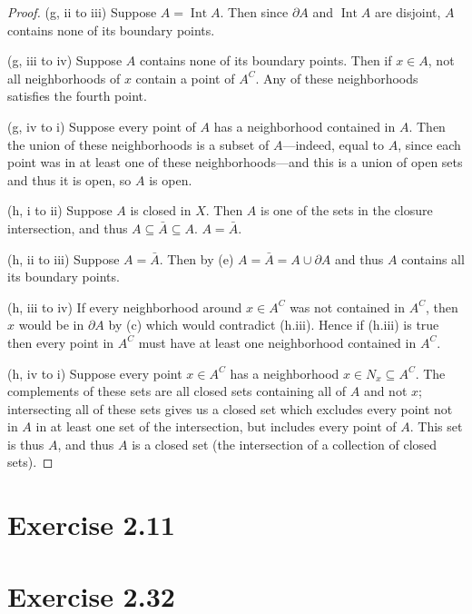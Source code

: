 \documentclass{article}
\theoremstyle{definition}
\begin{document}
\begin{proof}
(g, ii to iii)
Suppose $A = \operatorname{Int} A$. Then since $\partial A$ and $\operatorname{Int} A$
are disjoint, $A$ contains none of its boundary points.

(g, iii to iv)
Suppose $A$ contains none of its boundary points. Then if $x \in A$, not all neighborhoods
of $x$ contain a point of $A^C$. Any of these neighborhoods satisfies the fourth point.

(g, iv to i)
Suppose every point of $A$ has a neighborhood contained in $A$. Then the union of these
neighborhoods is a subset of $A$---indeed, equal to $A$, since each point was in at least
one of these neighborhoods---and this is a union of open sets and thus it is open, so 
$A$ is open.

(h, i to ii)
Suppose $A$ is closed in $X$. Then $A$ is one of the sets in the closure intersection,
and thus $A \subseteq \bar{A} \subseteq A$. $A=\bar{A}$.

(h, ii to iii)
Suppose $A = \bar{A}$. Then by (e) $A = \bar{A} = A \cup \partial A$ and thus $A$
contains all its boundary points.

(h, iii to iv) 
If every neighborhood around $x \in A^C$ was not contained in $A^C$, then 
$x$ would be in $\partial A$ by (c) which would contradict (h.iii). Hence
if (h.iii) is true then every point in $A^C$ must have at least one neighborhood
contained in $A^C$.

(h, iv to i)
Suppose every point $x \in A^C$ has a neighborhood $x \in N_x \subseteq A^C$. The 
complements of these sets are all closed sets containing all of $A$ and not $x$; 
intersecting all of these sets gives us a closed set which excludes every point
not in $A$ in at least one set of the intersection, but includes every point of
$A$. This set is thus $A$, and thus $A$ is a closed set (the intersection of 
a collection of closed sets).
\end{proof}

\section{Exercise 2.11}
\section{Exercise 2.32}
\end{document}
